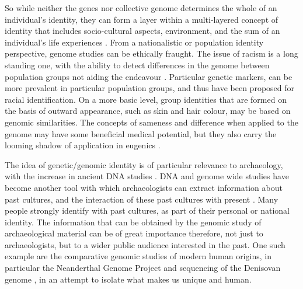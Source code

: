 So while neither the genes nor collective genome determines the whole of an individual’s identity, they can form a layer within a multi-layered concept of identity that includes socio-cultural aspects, environment, and the sum of an individual’s life experiences \parencite{Zeiler_2007}. From a nationalistic or population identity perspective, genome studies can be ethically fraught. The issue of racism is a long standing one, with the ability to detect differences in the genome between population groups not aiding the endeavour \parencite{Carter_2007}. Particular genetic markers, can be more prevalent in particular population groups, and thus have been proposed for racial identification. On a more basic level, group identities that are formed on the basis of outward appearance, such as skin and hair colour, may be based on genomic similarities. The concepts of sameness and difference when applied to the genome may have some beneficial medical potential, but they also carry the looming shadow of application in eugenics \parencite{Garver_1994}.  

The idea of genetic/genomic identity is of particular relevance to archaeology, with the increase in ancient DNA studies \parencite{Matisoo-Smith_2012}. DNA and genome wide studies have become another tool with which archaeologists can extract information about past cultures, and the interaction of these past cultures with present \parencite{Matisoo-Smith_2012}. Many people strongly identify with past cultures, as part of their personal or national identity. The information that can be obtained by the genomic study of archaeological material can be of great importance therefore, not just to archaeologists, but to a wider public audience interested in the past. One such example are the comparative genomic studies of modern human origins, in particular the Neanderthal Genome Project \parencite{Green_2010} and sequencing of the Denisovan genome \parencite{Meyer_2012}, in an attempt to isolate what makes us unique and human.


